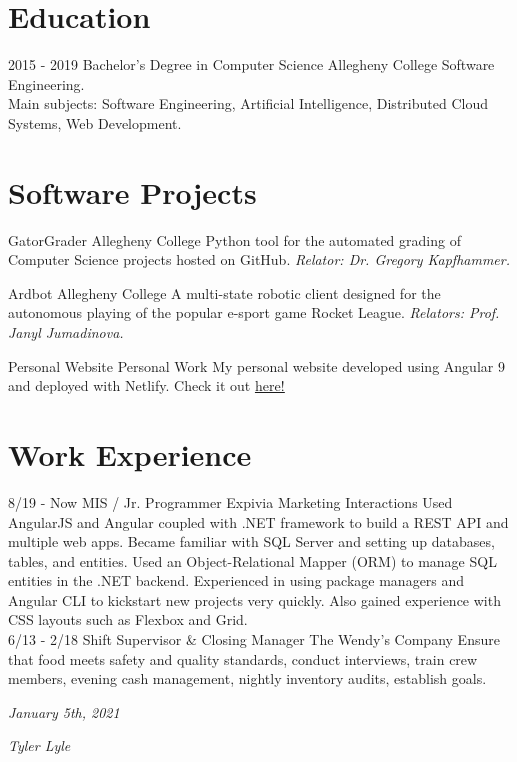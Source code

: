 \documentclass[]{friggeri-cv}
\begin{document}
\section{Education}
\begin{entrylist}
	\entry
	{2015 - 2019}
	{Bachelor's Degree in Computer Science}
	{Allegheny College}
	{Software Engineering.\\
		Main subjects: Software Engineering, Artificial Intelligence, Distributed Cloud Systems, Web Development.\\
	}

\end{entrylist}

\section{Software Projects}
\begin{entrylist}
	\entry
	{}
	{GatorGrader}
	{Allegheny College}
	{Python tool for the automated grading of Computer Science projects hosted on GitHub. \emph{Relator: Dr. Gregory Kapfhammer.}\\}
	
	\entry
	{}
	{Ardbot}
	{Allegheny College}
	{A multi-state robotic client designed for the autonomous playing of the popular e-sport game Rocket League. \emph{Relators: Prof. Janyl Jumadinova.}\\}
	
	\entry
	{}
	{Personal Website}
	{Personal Work}
	{My personal website developed using Angular 9 and deployed with Netlify. Check it out \underline{\href{https://tyler-lyle.netlify.com/}{here!}}\\}
	
\end{entrylist}

\section{Work Experience}
\begin{entrylist}
  \entry
    {8/19 - Now}
    {MIS / Jr. Programmer}
    {Expivia Marketing Interactions}
    {Used AngularJS and Angular coupled with .NET framework to build a REST API and multiple web apps.  Became familiar with SQL Server and setting up databases, tables, and entities.  Used an Object-Relational Mapper (ORM) to manage SQL entities in the .NET backend.  Experienced in using package managers and Angular CLI to kickstart new projects very quickly. Also gained experience with CSS layouts such as Flexbox and Grid.\\}
  \entry
    {6/13 - 2/18}
    {Shift Supervisor \& Closing Manager}
    {The Wendy's Company}
    {Ensure that food meets safety and quality standards, conduct interviews, train crew members, evening cash management, nightly inventory audits, establish goals.\\}
\end{entrylist}

\begin{flushleft}
\emph{January 5th, 2021}
\end{flushleft}
\begin{flushright}
\emph{Tyler Lyle}
\end{flushright}
\end{document}
